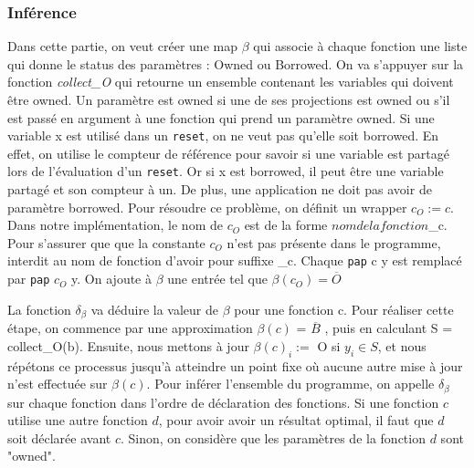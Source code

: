 \documentclass{rapportECL}
\begin{document}
\subsubsection{Inférence}
Dans cette partie, on veut créer une map $\beta$ qui associe à chaque fonction une liste qui donne le status des paramètres : Owned ou Borrowed.
On va s'appuyer sur la fonction \textit{collect\_O} qui retourne un ensemble contenant les variables qui doivent être owned.
Un paramètre est owned si une de ses projections est owned ou s'il est passé en argument à une fonction qui prend un paramètre owned.
Si une variable x est utilisé dans un \verb|reset|, on ne veut pas qu'elle soit borrowed. 
En effet, on utilise le compteur de référence pour savoir si une variable est partagé lors de l'évaluation d'un \verb|reset|. 
Or si x est borrowed, il peut être une variable partagé et son compteur à un.
De plus, une application ne doit pas avoir de paramètre borrowed. Pour résoudre ce problème, on définit un wrapper $c_O := c$. 
Dans notre implémentation, le nom de $c_O$ est de la forme $nom de la fonction$\_c. 
Pour s'assurer que que la constante $c_O$ n'est pas présente dans le programme, interdit au nom de fonction d'avoir pour suffixe \_c.
Chaque \verb|pap| c y est remplacé par \verb|pap| $c_O$ y. On ajoute à $\beta$ une entrée tel que $\beta(c_O) = \overline{O}$

La fonction $\delta_{\beta}$ va déduire la valeur de $\beta$ pour une fonction c. 
Pour réaliser cette étape, on commence par une approximation $\beta(c)$ = $\overline{B}$ , puis en calculant S = collect\_O(b). 
Ensuite, nous mettons à jour  $\beta(c)_i :=$ O  si $y_i \in S $, et nous répétons ce processus jusqu'à atteindre un point fixe où aucune autre mise à jour 
n'est effectuée sur $\beta(c)$.
Pour inférer l'ensemble du programme, on appelle $\delta_{\beta}$ sur chaque fonction dans l'ordre de déclaration des fonctions. 
Si une fonction $c$ utilise une autre fonction $d$, pour avoir avoir un résultat optimal, il faut que $d$ soit déclarée avant $c$. 
Sinon, on considère que les paramètres de la fonction $d$ sont "owned".
\end{document}
